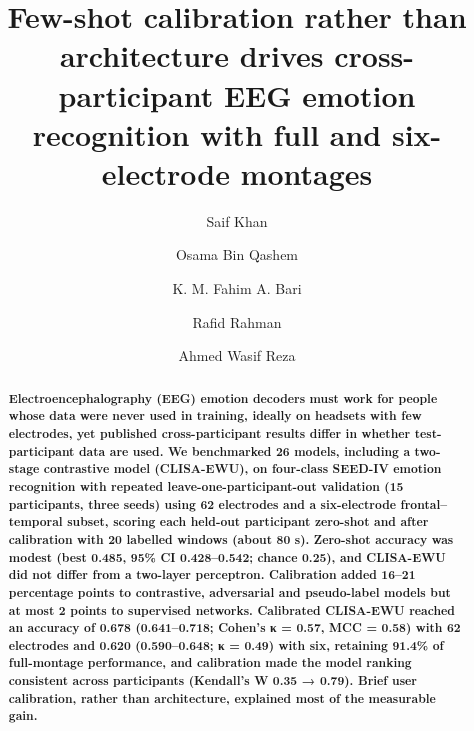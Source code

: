 
\title{\sffamily\bfseries Few-shot calibration rather than architecture drives cross-participant EEG emotion recognition with full and six-electrode montages}
\author[1,*]{Saif Khan}
\author[1]{Osama Bin Qashem}
\author[1]{K. M. Fahim A. Bari}
\author[1]{Rafid Rahman}
\author[1]{Ahmed Wasif Reza}
\date{}


\maketitle
\linenumbers

\begin{abstract}
\noindent\textbf{Electroencephalography (EEG) emotion decoders must work for people whose data were never used in training, ideally on headsets with few electrodes, yet published cross-participant results differ in whether test-participant data are used. We benchmarked 26 models, including a two-stage contrastive model (CLISA-EWU), on four-class SEED-IV emotion recognition with repeated leave-one-participant-out validation (15 participants, three seeds) using 62 electrodes and a six-electrode frontal–temporal subset, scoring each held-out participant zero-shot and after calibration with 20 labelled windows (about 80 s). Zero-shot accuracy was modest (best 0.485, 95\% CI 0.428–0.542; chance 0.25), and CLISA-EWU did not differ from a two-layer perceptron. Calibration added 16–21 percentage points to contrastive, adversarial and pseudo-label models but at most 2 points to supervised networks. Calibrated CLISA-EWU reached an accuracy of 0.678 (0.641–0.718; Cohen’s κ = 0.57, MCC = 0.58) with 62 electrodes and 0.620 (0.590–0.648; κ = 0.49) with six, retaining 91.4\% of full-montage performance, and calibration made the model ranking consistent across participants (Kendall’s W 0.35 → 0.79). Brief user calibration, rather than architecture, explained most of the measurable gain.}
\end{abstract}

